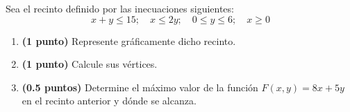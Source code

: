
Sea el recinto definido por las inecuaciones siguientes:
\[
x+y\leq15;\quad x\leq2y;\quad0\leq y\leq6;\quad x\geq0
\]
\begin{enumerate}[label=\alph*)]
\item \textbf{(1 punto)} Represente gráficamente dicho recinto.
\item \textbf{(1 punto)} Calcule sus vértices.
\item \textbf{(0.5 puntos)} Determine el máximo valor de la función $F(x,y)=8x+5y$ en el recinto anterior y dónde se alcanza.
\end{enumerate}
